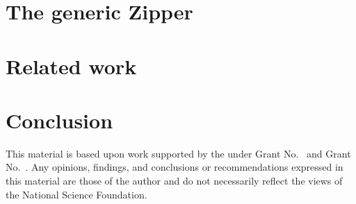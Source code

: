 \documentclass[sigplan,review,anonymous]{acmart}\settopmatter{printfolios=true,printccs=false,printacmref=false}
\begin{document}
\section{The generic Zipper}
\label{sec:generic-zipper}


\section{Related work}
\label{sec:related-work}


\section{Conclusion}
\label{sec:conclusion}

\begin{acks}                            %
  This material is based upon work supported by the
   under Grant
  No.~ and Grant
  No.~.  Any opinions, findings, and
  conclusions or recommendations expressed in this material are those
  of the author and do not necessarily reflect the views of the
  National Science Foundation.
\end{acks}






\end{document}
